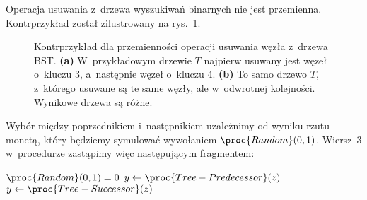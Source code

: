 \exercise %
Operacja usuwania z~drzewa wyszukiwań binarnych nie jest przemienna. Kontrprzykład został zilustrowany na rys.\ \ref{fig:12.3-5}.
\begin{figure}[!ht]
	\centering 
	\caption{Kontrprzykład dla przemienności operacji usuwania węzła z~drzewa BST.
{\sffamily\bfseries(a)} W~przykładowym drzewie $T$ najpierw usuwany jest węzeł o~kluczu 3, a~następnie węzeł o~kluczu 4.
{\sffamily\bfseries(b)} To samo drzewo $T$, z~którego usuwane są te same węzły, ale w~odwrotnej kolejności.
Wynikowe drzewa są różne.} \label{fig:12.3-5}
\end{figure}

\exercise %
Wybór między poprzednikiem i~następnikiem uzależnimy od wyniku rzutu monetą, który będziemy symulować wywołaniem $\proc{Random}(0,1)$.
Wiersz~3 w~procedurze  zastąpimy więc następującym fragmentem:
\begin{codebox}
\zi	\If $\proc{Random}(0,1)=0$
\zi		\Then $y\gets\proc{Tree-Predecessor}(z)$
\zi		\Else $y\gets\proc{Tree-Successor}(z)$
\zi		\End
\end{codebox}

